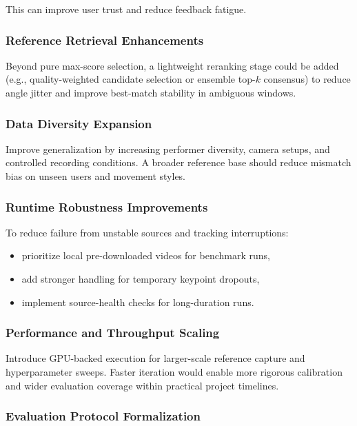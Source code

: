 \documentclass[12pt]{article}
\begin{document}
{This can improve user trust and reduce feedback fatigue.

\subsubsection{Reference Retrieval Enhancements}

Beyond pure max-score selection, a lightweight reranking stage could be added (e.g., quality-weighted candidate selection or ensemble top-\(k\) consensus) to reduce angle jitter and improve best-match stability in ambiguous windows.

\subsubsection{Data Diversity Expansion}

Improve generalization by increasing performer diversity, camera setups, and controlled recording conditions. A broader reference base should reduce mismatch bias on unseen users and movement styles.

\subsubsection{Runtime Robustness Improvements}

To reduce failure from unstable sources and tracking interruptions:

\begin{itemize}
    \item prioritize local pre-downloaded videos for benchmark runs,
    \item add stronger handling for temporary keypoint dropouts,
    \item implement source-health checks for long-duration runs.
\end{itemize}

\subsubsection{Performance and Throughput Scaling}

Introduce GPU-backed execution for larger-scale reference capture and hyperparameter sweeps. Faster iteration would enable more rigorous calibration and wider evaluation coverage within practical project timelines.

\subsubsection{Evaluation Protocol Formalization}

}
\end{document}

